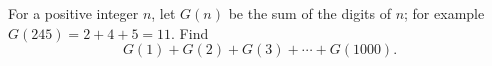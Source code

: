 For a positive integer $n$, let $G(n)$ be the sum of the digits of $n$; for example $G(245)=2+4+5=11$. Find
\[G(1)+G(2)+G(3)+\cdots+G(1000).\]
